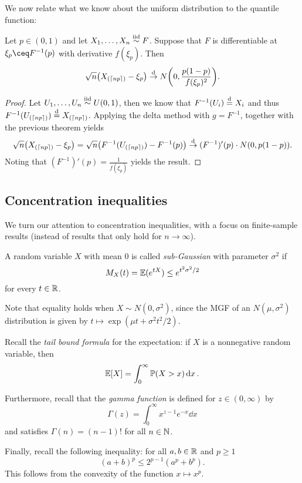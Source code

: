 We now relate what we know about the uniform distribution to the  quantile function: 
\begin{theorem}
    Let $p \in (0, 1)$ and let $X_1, \dotsc, X_n \overset{\mathrm{iid}}{\sim} F$. Suppose that $F$ is differentiable at $\xi_p \ceq F^{-1}(p)$ with derivative $f(\xi_p)$. Then
    \[
    \sqrt n \qty(X_{(\lceil np\rceil)} - \xi_p) \overset{\mathrm{d}}{\to} N\qty(0, \frac{p(1-p)}{f(\xi_p)^2}).
    \]
\end{theorem}

\begin{proof}
    Let $U_1, \dotsc, U_n \overset{\mathrm{iid}}{\sim} U(0, 1)$, then we know that $F^{-1}(U_i) \overset{\mathrm{d}}= X_i$ and thus $F^{-1} (U_{(\lceil np\rceil)}) \overset{\mathrm{d}}= X_{(\lceil np\rceil)}$. Applying the delta method with $g = F^{-1}$, together with the previous theorem yields
    \[
    \sqrt n \qty(X_{(\lceil np\rceil)} - \xi_p) = \sqrt n \qty(F^{-1}(U_{(\lceil np\rceil)}) - F^{-1}(p)) \overset{\mathrm{d}}{\to} (F^{-1})'(p) \cdot  N(0, p(1-p)).
    \]
    Noting that $(F^{-1})'(p) = \frac1{f(\xi_p)}$ yields the result. 
\end{proof}

\subsection{Concentration inequalities}
We turn our attention to concentration inequalities, with a focus on finite-sample results (instead of results that only hold for $n \to\infty$). 
\begin{definition}
    A random variable $X$ with mean 0 is called \emph{sub-Gaussian} with parameter $\sigma^2$ if
    \[
    M_X(t) = \mathbb E(e^{tX}) \leq e^{t^2\sigma^2/2}
    \]
    for every $t \in \mathbb R$. 
\end{definition}
Note that equality holds when $X \sim N(0, \sigma^2)$, since the MGF of an $N(\mu, \sigma^2)$ distribution is given by $t \mapsto \exp(\mu t + \sigma^2 t^2 /2)$. 

\begin{recap}
	Recall the \emph{tail bound formula} for the expectation: if $X$ is a nonnegative random variable, then 
	\[
	\mathbb E[X] = \int_0^\infty \mathbb P(X > x) \dd{x}. 
	\]
	
	Furthermore, recall that the \emph{gamma function} is defined for $z \in (0, \infty)$ by
	\[
	\Gamma(z) = \int_0^\infty x^{z-1} e^{-x} \dd{x}
	\]
	and satisfies $\Gamma(n) = (n-1)!$ for all $n \in \mathbb N$. 
	
	Finally, recall the following inequality: for all $a, b \in \mathbb R$ and $p \geq 1$
	\[
	(a+b)^p \leq 2^{p-1} (a^p + b^p). 
	\]
	This follows from the convexity of the function $x \mapsto x^p$. 
\end{recap}

